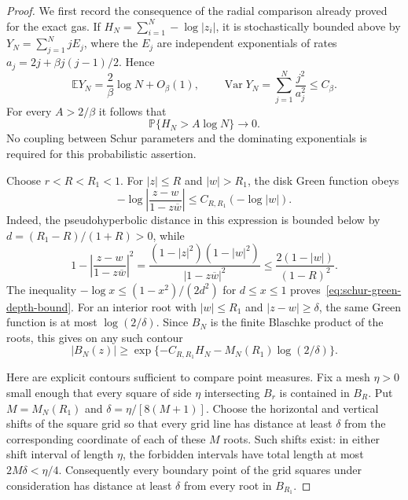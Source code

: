 \documentclass[11pt,a4paper]{article}
\numberwithin{equation}{section}
\theoremstyle{definition}
\theoremstyle{remark}
\begin{document}
\begin{proof}
We first record the consequence of the radial comparison already
proved for the exact gas. If
$H_N=\sum_{i=1}^N-\log|z_i|$, it is stochastically bounded above by
$Y_N=\sum_{j=1}^NjE_j$, where the $E_j$ are independent exponentials
of rates $a_j=2j+\beta j(j-1)/2$. Hence
\[
 \mathbb E Y_N=\frac2\beta\log N+O_\beta(1),\qquad
 \operatorname{Var}Y_N=\sum_{j=1}^N\frac{j^2}{a_j^2}
                      \le C_\beta.
\]
For every $A>2/\beta$ it follows that
\begin{equation}
 \mathbb P\{H_N>A\log N\}\longrightarrow0.
 \label{eq:schur-total-depth-logarithmic}
\end{equation}
No coupling between Schur parameters and the dominating exponentials
is required for this probabilistic assertion.

Choose $r<R<R_1<1$. For $|z|\le R$ and $|w|>R_1$, the disk Green
function obeys
\begin{equation}
 -\log\left|\frac{z-w}{1-z\overline w}\right|
 \le C_{R,R_1}(-\log|w|).
 \label{eq:schur-green-depth-bound}
\end{equation}
Indeed, the pseudohyperbolic distance in this expression is bounded
below by $d=(R_1-R)/(1+R)>0$, while
\[
 1-\left|\frac{z-w}{1-z\overline w}\right|^2
 =\frac{(1-|z|^2)(1-|w|^2)}{|1-z\overline w|^2}
 \le\frac{2(1-|w|)}{(1-R)^2}.
\]
The inequality $-\log x\le(1-x^2)/(2d^2)$ for $d\le x\le1$
proves~\eqref{eq:schur-green-depth-bound}.
For an interior root with $|w|\le R_1$ and $|z-w|\ge\delta$, the
same Green function is at most $\log(2/\delta)$. Since $B_N$ is the
finite Blaschke product of the roots, this gives on any such contour
\begin{equation}
 |B_N(z)|\ge
 \exp\{-C_{R,R_1}H_N-M_N(R_1)\log(2/\delta)\}.
 \label{eq:schur-contour-lower-bound}
\end{equation}

Here are explicit contours sufficient to compare point measures.
Fix a mesh $\eta>0$ small enough that every square of side $\eta$
intersecting $B_r$ is contained in $B_R$. Put $M=M_N(R_1)$ and
$\delta=\eta/[8(M+1)]$. Choose the horizontal and vertical shifts
of the square grid so that every grid line has distance at least
$\delta$ from the corresponding coordinate of each of these $M$
roots. Such shifts exist: in either shift interval of length $\eta$,
the forbidden intervals have total length at most
$2M\delta<\eta/4$. Consequently every boundary point of the grid
squares under consideration has distance at least $\delta$ from
every root in $B_{R_1}$.


\end{proof}
\end{document}
